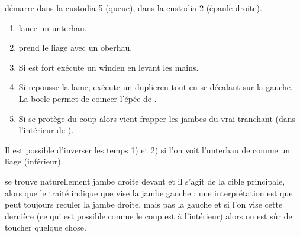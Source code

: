 \begin{technique}[Liegniczer 2]
\A démarre dans la custodia 5 (queue), \D dans la custodia 2 (épaule droite).

\begin{enumerate}
	\item \A lance un unterhau.
	
	\item \D prend le liage avec un oberhau.
	
	\item {}
		Si \D est fort \A exécute un winden en levant les mains.
	
	\item {}
		Si \D repousse la lame, \A exécute un duplieren tout en se décalant sur la gauche.
		La bocle permet de coincer l'épée de \D.
	
	\item Si \D se protège du coup alors \A vient frapper les jambes du vrai tranchant (dans l'intérieur de \D).
\end{enumerate}

Il est possible d'inverser les temps 1) et 2) si l'on voit l'unterhau de \A comme un liage (inférieur).

\D se trouve naturellement jambe droite devant et il s'agit de la cible principale, alors que le traité indique que \A vise la jambe gauche : une interprétation est que \D peut toujours reculer la jambe droite, mais pas la gauche et si l'on vise cette dernière (ce qui est possible comme le coup est à l'intérieur) alors on est sûr de toucher quelque chose.

\end{technique}

